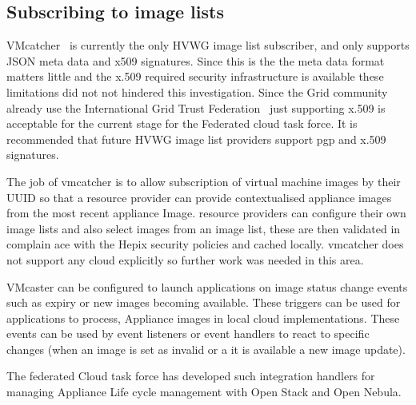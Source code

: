 \documentclass{llncs_Ibergrid2013}
\begin{document}
\subsection{Subscribing to image lists}

VMcatcher~\cite{vmcatcher} is currently the only HVWG image list subscriber, and only supports JSON meta data and x509 signatures. Since this is the the meta data format matters little and the x.509 required security infrastructure is available these limitations did not not hindered this investigation. Since the Grid community already use the International Grid Trust Federation~\cite{igtf} just supporting x.509 is acceptable for the current stage for the Federated cloud task force. It is recommended that future HVWG image list providers support pgp and x.509 signatures.

The job of vmcatcher is to allow subscription of virtual machine images by their UUID so that a resource provider can provide contextualised appliance images from the most recent appliance Image. resource providers can configure their own image lists and also select images from an image list, these are then validated in complain ace with the Hepix security policies and cached locally. vmcatcher does not support any cloud explicitly so further work was needed in this area.

VMcaster can be configured to launch applications on image status change events such as expiry or new images becoming available. These triggers can be used for applications to process, Appliance images in local cloud implementations.  These events can be used by event listeners or event handlers to react to specific changes (when an image is set as invalid or a it is available a new image update). 

The federated Cloud task force has developed such integration handlers for managing Appliance Life cycle management with Open Stack and Open Nebula.
\end{document}
